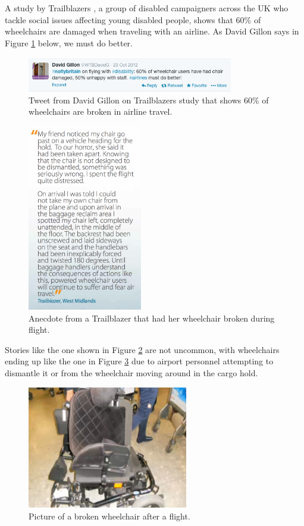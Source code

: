 A study by Trailblazers \cite{trailblazers}, a group of disabled campaigners across the UK who tackle social issues affecting young disabled people, shows that 60\% of wheelchairs are damaged when traveling with an airline. As David Gillon says in Figure \ref{fig:60percenttweet.png} below, we must do better. 


\begin{figure}[h]
  \centering
     \includegraphics[width=9cm]{images/60percenttweet.png}
   \caption{Tweet from David Gillon on Trailblazers study that shows 60\% of wheelchairs are broken in airline travel. }
  \label{fig:60percenttweet.png}
\end{figure}

\begin{figure}[h]
  \centering
     \includegraphics[width=5cm]{images/wheelchairstory.png}
   \caption{Anecdote from a Trailblazer that had her wheelchair broken during flight. \cite{trailblazers}}
  \label{fig:wheelchairstory.png}
\end{figure}

Stories like the one shown in Figure \ref{fig:wheelchairstory.png} are not uncommon, with wheelchairs ending up like the one in Figure \ref{fig:brokenwheelchair.png} due to airport personnel attempting to dismantle it or from the wheelchair moving around in the cargo hold. 


\begin{figure}[h]
  \centering
     \includegraphics[width=7cm]{images/brokenwheelchair.png}
   \caption{Picture of a broken wheelchair after a flight. \cite{broken_wheelchair}}
  \label{fig:brokenwheelchair.png}
\end{figure}

